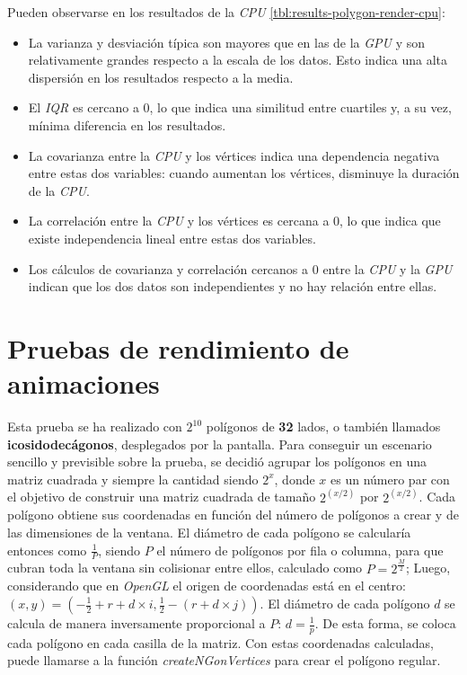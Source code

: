 Pueden observarse en los resultados de la \textit{CPU} \ref{tbl:results-polygon-render-cpu}:
\begin{itemize}

    \item La varianza y desviación típica son mayores que en las de la \textit{GPU} y son relativamente grandes respecto a la escala de los datos. Esto indica una alta dispersión en los resultados respecto a la media.

    \item El \textit{IQR} es cercano a 0, lo que indica una similitud entre cuartiles y, a su vez, mínima diferencia en los resultados.

    \item La covarianza entre la \textit{CPU} y los vértices indica una dependencia negativa entre estas dos variables: cuando aumentan los vértices, disminuye la duración de la \textit{CPU}.

    \item La correlación entre la \textit{CPU} y los vértices es cercana a $0$, lo que indica que existe independencia lineal entre estas dos variables.

    \item Los cálculos de covarianza y correlación cercanos a $0$ entre la \textit{CPU} y la \textit{GPU} indican que los dos datos son independientes y no hay relación entre ellas.

\end{itemize}

\FloatBarrier


\section{Pruebas de rendimiento de animaciones} \label{sec:animation-performance-test}

Esta prueba se ha realizado con $2^{10}$ polígonos de \textbf{32} lados, o también llamados \textbf{icosidodecágonos}, desplegados por la pantalla. Para conseguir un escenario sencillo y previsible sobre la prueba, se decidió agrupar los polígonos en una matriz cuadrada y siempre la cantidad siendo $2^x$, donde $x$ es un número par con el objetivo de construir una matriz cuadrada de tamaño $2^{(x/2)}$ por $2^{(x/2)}$. Cada polígono obtiene sus coordenadas en función del número de polígonos a crear y de las dimensiones de la ventana. El diámetro de cada polígono se calcularía entonces como $\frac{1}{P}$, siendo $P$ el número de polígonos por fila o columna, para que cubran toda la ventana sin colisionar entre ellos, calculado como $P = 2^{\frac{M}{2}}$; Luego, considerando que en \textit{OpenGL} el origen de coordenadas está en el centro: $(x,y) = (-\frac{1}{2} + r + d \times i, \frac{1}{2} - (r + d \times j))$. El diámetro de cada polígono $d$ se calcula de manera inversamente proporcional a $P$: $d = \frac{1}{p}$. De esta forma, se coloca cada polígono en cada casilla de la matriz. Con estas coordenadas calculadas, puede llamarse a la función \textit{createNGonVertices} para crear el polígono regular.


